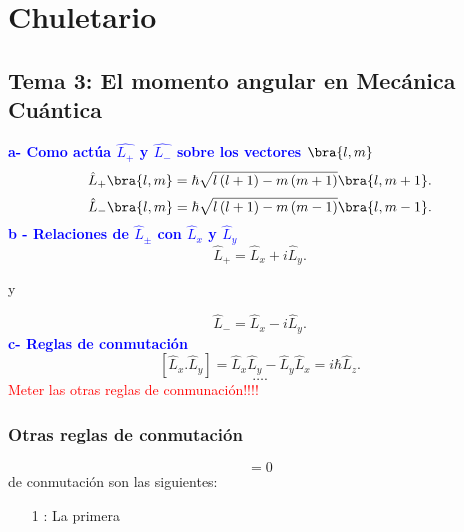 \chapter{Chuletario}%
\label{sec:Chuletario}
\section{Tema 3: El momento angular en Mecánica Cuántica}%
\twocolumn
\textcolor{blue}{\textbf{a- Como actúa $\hat{L_+}$ y $  \hat{L_-}$ sobre los vectores $\bra{l,m}$} }
    \[
        \hat{L}_+\bra{l,m}=\hbar \sqrt{l\left( l+1 \right) -m \left( m+1 \right) } \bra{l,m+1}
    .\] 
    \[
        \hat{L}_-\bra{l,m}=\hbar \sqrt{l\left( l+1 \right) -m\left( m-1 \right) } \bra{l,m-1}
    .\] 
\textcolor{blue}{\textbf{b - Relaciones de $\hat{L}_\pm$ con $\hat{L}_x$ y $\hat{L}_y$}} 
\[
\hat{L}_+=\hat{L}_x + i \hat{L}_y
.\] 
\begin{center}
    y        
\end{center}
\[
\hat{L}_-=\hat{L}_x - i \hat{L}_y
.\] 
\textcolor{blue}{\textbf{c- Reglas de conmutación}}
\[
    \left[ \hat{L}_x . \hat{L}_y \right]= \hat{L}_x \hat{L}_y - \hat{L}_y \hat{L}_x= i \hbar \hat{L}_z
.\] 
 \[
\ldots
.\] 
\textcolor{red}{Meter las otras reglas de conmunación!!!!}

\subsection{Otras reglas de conmutación}
\begin{equation}
    [L_x,L_y]=0
\end{equation}
de conmutación son las siguientes:  

\begin{itemize}
    \item [1]: La primera   
            
\end{itemize}
